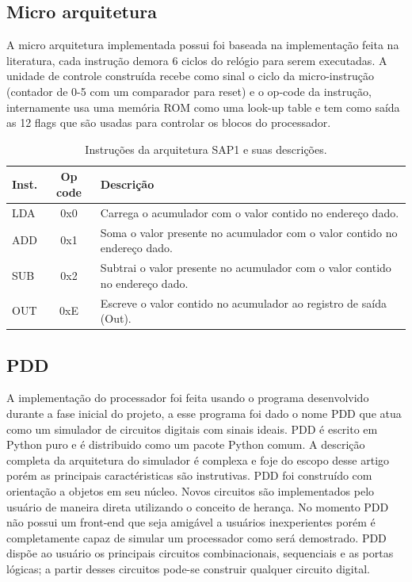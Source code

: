 \documentclass[11pt, twocolumn]{article}
\begin{document}
\subsection{Micro arquitetura}
A micro arquitetura implementada possui foi baseada na implementação feita na literatura, cada instrução demora 6 ciclos do relógio para serem executadas. A unidade de controle construída recebe como sinal o ciclo da micro-instrução (contador de 0-5 com um comparador para reset) e o op-code da instrução, internamente usa uma memória ROM como uma look-up table e tem como saída as 12 flags que são usadas para controlar os blocos do processador.

\begin{table}
  \caption{Instruções da arquitetura SAP1 e suas descrições.}
\begin{tabular*}{\linewidth}{lcp{8cm}}
  \hline
 Inst. & Op code & Descrição \\
 \hline
 LDA         &     0x0 & Carrega o acumulador com o valor contido no endereço dado. \\
 ADD         &     0x1 & Soma o valor presente no acumulador com o valor contido no endereço dado. \\
 SUB         &     0x2 & Subtrai o valor presente no acumulador com o valor contido no endereço dado.\\
 OUT         &     0xE & Escreve o valor contido no acumulador ao registro de saída (Out). \\ 
 \hline
\end{tabular*}
\label{tab-inst}
\end{table}


\subsection{PDD}
A implementação do processador foi feita usando o programa desenvolvido durante a fase inicial do projeto, a esse programa foi dado o nome PDD que atua como um simulador de circuitos digitais com sinais ideais. PDD é escrito em Python puro e é distribuido como um pacote Python comum. A descrição completa da arquitetura do simulador é complexa e foje do escopo desse artigo porém as principais caractéristicas são instrutivas. PDD foi construído com orientação a objetos em seu núcleo. Novos circuitos são implementados pelo usuário de maneira direta utilizando o conceito de herança. No momento PDD não possui um front-end que seja amigável a usuários inexperientes porém é completamente capaz de simular um processador como será demostrado. PDD dispõe ao usuário os principais circuitos combinacionais, sequenciais e as portas lógicas; a partir desses circuitos pode-se construir qualquer circuito digital.
\end{document}
